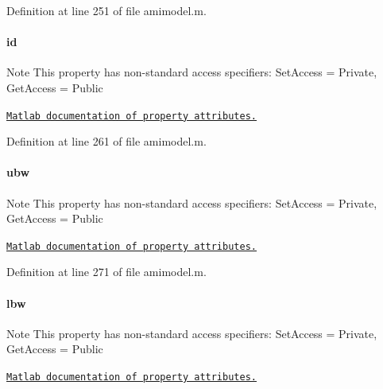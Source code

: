 Definition at line 251 of file amimodel.\+m.

\hypertarget{classamimodel_acf2488b95c97e0378c9bf49de3b50f28}{}
\paragraph[{id}]{\setlength{\rightskip}{0pt plus 5cm}id}\label{classamimodel_acf2488b95c97e0378c9bf49de3b50f28}
\begin{DoxyNote}{Note}
This property has non-\/standard access specifiers\+: {\ttfamily Set\+Access = Private, Get\+Access = Public} 

\href{http://www.mathworks.com/help/matlab/matlab_oop/property-attributes.html}{\tt Matlab documentation of property attributes.} 
\end{DoxyNote}


Definition at line 261 of file amimodel.\+m.

\hypertarget{classamimodel_a955c9d10635afed4ebc04c60010e5d40}{}
\paragraph[{ubw}]{\setlength{\rightskip}{0pt plus 5cm}ubw}\label{classamimodel_a955c9d10635afed4ebc04c60010e5d40}
\begin{DoxyNote}{Note}
This property has non-\/standard access specifiers\+: {\ttfamily Set\+Access = Private, Get\+Access = Public} 

\href{http://www.mathworks.com/help/matlab/matlab_oop/property-attributes.html}{\tt Matlab documentation of property attributes.} 
\end{DoxyNote}


Definition at line 271 of file amimodel.\+m.

\hypertarget{classamimodel_a784f5fb2b8eda576179be087c2a09a39}{}
\paragraph[{lbw}]{\setlength{\rightskip}{0pt plus 5cm}lbw}\label{classamimodel_a784f5fb2b8eda576179be087c2a09a39}
\begin{DoxyNote}{Note}
This property has non-\/standard access specifiers\+: {\ttfamily Set\+Access = Private, Get\+Access = Public} 

\href{http://www.mathworks.com/help/matlab/matlab_oop/property-attributes.html}{\tt Matlab documentation of property attributes.} 
\end{DoxyNote}


